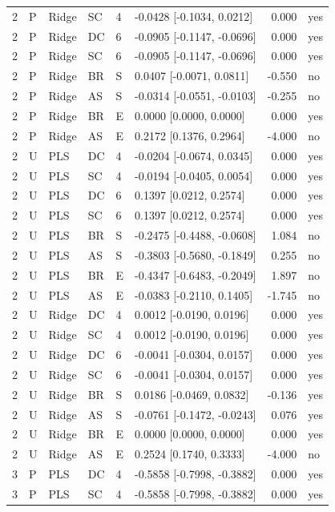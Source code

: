 \documentclass[10pt,a4paper]{article}
\begin{document}
\begin{landscape}
\begin{longtable}{rlllllrl}
2 & P & Ridge & SC & 4 & -0.0428 [-0.1034, 0.0212] & 0.000 & yes \\
2 & P & Ridge & DC & 6 & -0.0905 [-0.1147, -0.0696] & 0.000 & yes \\
2 & P & Ridge & SC & 6 & -0.0905 [-0.1147, -0.0696] & 0.000 & yes \\
2 & P & Ridge & BR & S & 0.0407 [-0.0071, 0.0811] & -0.550 & no \\
2 & P & Ridge & AS & S & -0.0314 [-0.0551, -0.0103] & -0.255 & no \\
2 & P & Ridge & BR & E & 0.0000 [0.0000, 0.0000] & 0.000 & yes \\
2 & P & Ridge & AS & E & 0.2172 [0.1376, 0.2964] & -4.000 & no \\
2 & U & PLS & DC & 4 & -0.0204 [-0.0674, 0.0345] & 0.000 & yes \\
2 & U & PLS & SC & 4 & -0.0194 [-0.0405, 0.0054] & 0.000 & yes \\
2 & U & PLS & DC & 6 & 0.1397 [0.0212, 0.2574] & 0.000 & yes \\
2 & U & PLS & SC & 6 & 0.1397 [0.0212, 0.2574] & 0.000 & yes \\
2 & U & PLS & BR & S & -0.2475 [-0.4488, -0.0608] & 1.084 & no \\
2 & U & PLS & AS & S & -0.3803 [-0.5680, -0.1849] & 0.255 & no \\
2 & U & PLS & BR & E & -0.4347 [-0.6483, -0.2049] & 1.897 & no \\
2 & U & PLS & AS & E & -0.0383 [-0.2110, 0.1405] & -1.745 & no \\
2 & U & Ridge & DC & 4 & 0.0012 [-0.0190, 0.0196] & 0.000 & yes \\
2 & U & Ridge & SC & 4 & 0.0012 [-0.0190, 0.0196] & 0.000 & yes \\
2 & U & Ridge & DC & 6 & -0.0041 [-0.0304, 0.0157] & 0.000 & yes \\
2 & U & Ridge & SC & 6 & -0.0041 [-0.0304, 0.0157] & 0.000 & yes \\
2 & U & Ridge & BR & S & 0.0186 [-0.0469, 0.0832] & -0.136 & yes \\
2 & U & Ridge & AS & S & -0.0761 [-0.1472, -0.0243] & 0.076 & yes \\
2 & U & Ridge & BR & E & 0.0000 [0.0000, 0.0000] & 0.000 & yes \\
2 & U & Ridge & AS & E & 0.2524 [0.1740, 0.3333] & -4.000 & no \\
3 & P & PLS & DC & 4 & -0.5858 [-0.7998, -0.3882] & 0.000 & yes \\
3 & P & PLS & SC & 4 & -0.5858 [-0.7998, -0.3882] & 0.000 & yes \\

\end{longtable}
\end{landscape}
\end{document}
